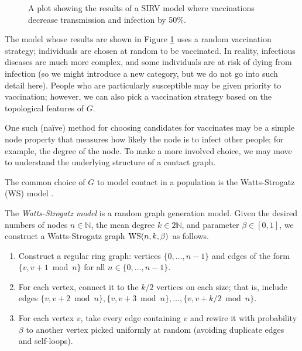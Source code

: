 \begin{figure}
    \caption{A plot showing the results of a SIRV model where vaccinations decrease transmission and infection by 50\%.}
    \label{fig:disease-model-vaccine}
\end{figure}

The model whose results are shown in Figure \ref{fig:disease-model-vaccine} uses a random vaccination strategy; individuals are chosen at random to be vaccinated. In reality, infectious diseases are much more complex, and some individuals are at risk of dying from infection (so we might introduce a new category, but we do not go into such detail here). People who are particularly susceptible may be given priority to vaccination; however, we can also pick a vaccination strategy based on the topological features of $G$. 

One such (na\"ive) method for choosing candidates for vaccinates may be a simple node property that measures how likely the node is to infect other people; for example, the degree of the node. To make a more involved choice, we may move to understand the underlying structure of a contact graph. 

The common choice of $G$ to model contact in a population is the Watts-Strogatz (WS) model \cite{watts1998collective}.

\begin{definition}
    The \emph{Watts-Strogatz model} is a random graph generation model. Given the desired numbers of nodes $n \in \mathbb N$, the mean degree $k \in 2\mathbb N$, and parameter $\beta \in [0,1]$, we construct a Watts-Strogatz graph $\operatorname{WS}(n, k, \beta)$ as follows.
    \begin{enumerate}
        \item Construct a regular ring graph: vertices $\{0, \ldots, n-1\}$ and edges of the form $\{v, v + 1 \bmod n\}$ for all $n \in \{0, \ldots, n-1\}$. 
        \item For each vertex, connect it to the $k/2$ vertices on each size; that is, include edges $\{v, v+2 \bmod n\}, \{v, v+3 \bmod n\}, \ldots, \{v, v+k/2 \bmod n\}$.
        \item For each vertex $v$, take every edge containing $v$ and rewire it with probability $\beta$ to another vertex picked uniformly at random (avoiding duplicate edges and self-loops).
    \end{enumerate}
\end{definition}

